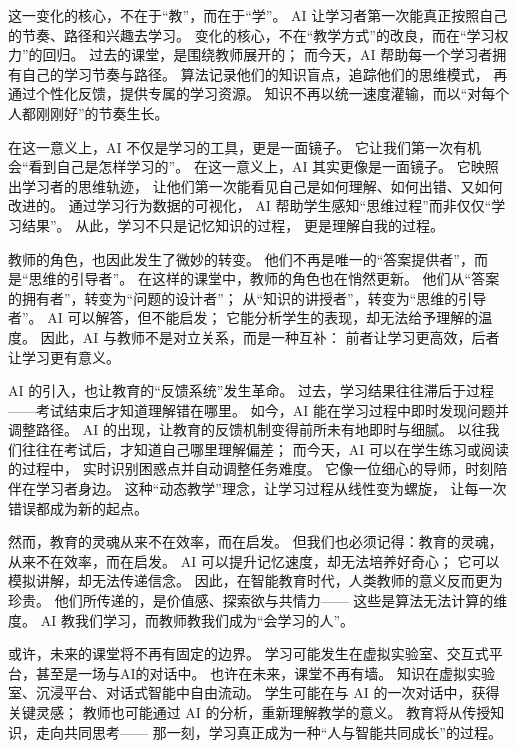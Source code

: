 这一变化的核心，不在于“教”，而在于“学”。  
AI 让学习者第一次能真正按照自己的节奏、路径和兴趣去学习。  
变化的核心，不在“教学方式”的改良，而在“学习权力”的回归。  
过去的课堂，是围绕教师展开的；  
而今天，AI 帮助每一个学习者拥有自己的学习节奏与路径。  
算法记录他们的知识盲点，追踪他们的思维模式，  
再通过个性化反馈，提供专属的学习资源。  
知识不再以统一速度灌输，而以“对每个人都刚刚好”的节奏生长。

在这一意义上，AI 不仅是学习的工具，更是一面镜子。  
它让我们第一次有机会“看到自己是怎样学习的”。  
在这一意义上，AI 其实更像是一面镜子。  
它映照出学习者的思维轨迹，  
让他们第一次能看见自己是如何理解、如何出错、又如何改进的。  
通过学习行为数据的可视化，  
AI 帮助学生感知“思维过程”而非仅仅“学习结果”。  
从此，学习不只是记忆知识的过程，  
更是理解自我的过程。

教师的角色，也因此发生了微妙的转变。  
他们不再是唯一的“答案提供者”，而是“思维的引导者”。  
在这样的课堂中，教师的角色也在悄然更新。  
他们从“答案的拥有者”，转变为“问题的设计者”；  
从“知识的讲授者”，转变为“思维的引导者”。  
AI 可以解答，但不能启发；  
它能分析学生的表现，却无法给予理解的温度。  
因此，AI 与教师不是对立关系，而是一种互补：  
前者让学习更高效，后者让学习更有意义。

AI 的引入，也让教育的“反馈系统”发生革命。  
过去，学习结果往往滞后于过程——考试结束后才知道理解错在哪里。  
如今，AI 能在学习过程中即时发现问题并调整路径。  
AI 的出现，让教育的反馈机制变得前所未有地即时与细腻。  
以往我们往往在考试后，才知道自己哪里理解偏差；  
而今天，AI 可以在学生练习或阅读的过程中，  
实时识别困惑点并自动调整任务难度。  
它像一位细心的导师，时刻陪伴在学习者身边。  
这种“动态教学”理念，让学习过程从线性变为螺旋，  
让每一次错误都成为新的起点。

然而，教育的灵魂从来不在效率，而在启发。  
但我们也必须记得：教育的灵魂，从来不在效率，而在启发。  
AI 可以提升记忆速度，却无法培养好奇心；  
它可以模拟讲解，却无法传递信念。  
因此，在智能教育时代，人类教师的意义反而更为珍贵。  
他们所传递的，是价值感、探索欲与共情力——  
这些是算法无法计算的维度。  
AI 教我们学习，而教师教我们成为“会学习的人”。

或许，未来的课堂将不再有固定的边界。  
学习可能发生在虚拟实验室、交互式平台，甚至是一场与AI的对话中。  
也许在未来，课堂不再有墙。  
知识在虚拟实验室、沉浸平台、对话式智能中自由流动。  
学生可能在与 AI 的一次对话中，获得关键灵感；  
教师也可能通过 AI 的分析，重新理解教学的意义。  
教育将从传授知识，走向共同思考——  
那一刻，学习真正成为一种“人与智能共同成长”的过程。


